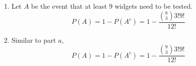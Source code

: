 \begin{enumerate}[label=(\alph*)]
\item Let $A$ be the event that at least $9$ widgets need to be tested. 
$$P(A) = 1 - P(A^{c}) = 1 - \frac{\binom{8}{3}3!9!}{12!}$$

\item Similar to part $a$, $$P(A) = 1 - P(A^{c}) = 1 - \frac{\binom{9}{3}3!9!}{12!}$$
\end{enumerate}